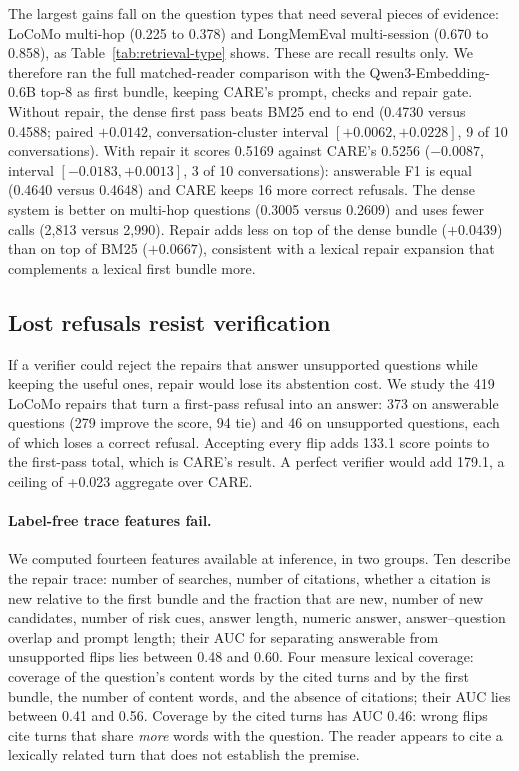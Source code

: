 \documentclass[11pt]{article}
\newcommand{\care}{\textsc{CARE}}
\begin{document}
The largest gains fall on the question types that need several pieces of
evidence: LoCoMo multi-hop (0.225 to 0.378) and LongMemEval multi-session
(0.670 to 0.858), as Table~\ref{tab:retrieval-type} shows. These are recall
results only. We therefore ran the full matched-reader comparison with the
Qwen3-Embedding-0.6B top-8 as first bundle, keeping \care{}'s prompt, checks and
repair gate. Without repair, the dense first pass beats BM25 end to end (0.4730
versus 0.4588; paired $+0.0142$, conversation-cluster interval $[+0.0062,+0.0228]$,
9 of 10 conversations). With repair it scores 0.5169 against \care{}'s 0.5256
($-0.0087$, interval $[-0.0183,+0.0013]$, 3 of 10 conversations): answerable F1 is
equal (0.4640 versus 0.4648) and \care{} keeps 16 more correct refusals. The dense
system is better on multi-hop questions (0.3005 versus 0.2609) and uses fewer calls
(2,813 versus 2,990). Repair adds less on top of the dense bundle ($+0.0439$) than on
top of BM25 ($+0.0667$), consistent with a lexical repair expansion that complements a
lexical first bundle more.

\subsection{Lost refusals resist verification}
\label{sec:verify}

If a verifier could reject the repairs that answer unsupported questions while
keeping the useful ones, repair would lose its abstention cost. We study the
419 LoCoMo repairs that turn a first-pass refusal into an answer: 373 on
answerable questions (279 improve the score, 94 tie) and 46 on unsupported
questions, each of which loses a correct refusal. Accepting every flip adds
133.1 score points to the first-pass total, which is \care{}'s result. A perfect
verifier would add 179.1, a ceiling of +0.023 aggregate over \care{}.

\paragraph{Label-free trace features fail.}
We computed fourteen features available at inference, in two groups. Ten
describe the repair trace: number of searches, number of citations, whether a
citation is new relative to the first bundle and the fraction that are new,
number of new candidates, number of risk cues, answer length, numeric answer,
answer--question overlap and prompt length; their AUC for separating answerable
from unsupported flips lies between 0.48 and 0.60. Four measure lexical
coverage: coverage of the question's content words by the cited turns and by the
first bundle, the number of content words, and the absence of citations; their
AUC lies between 0.41 and 0.56. Coverage by the cited turns has AUC 0.46: wrong
flips cite turns that share \emph{more} words with the question. The reader appears
to cite a lexically related turn that does not establish the premise.
\end{document}
